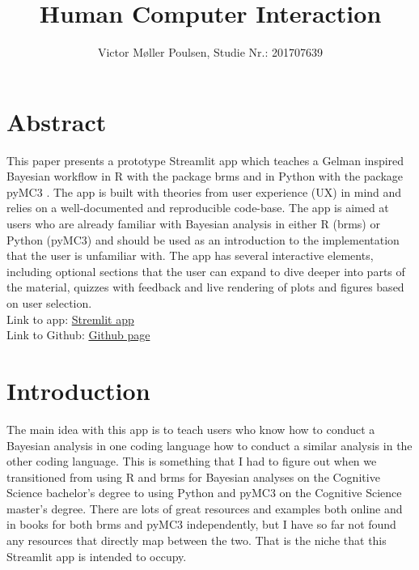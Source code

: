 \documentclass[12pt]{article}
\title{Human Computer Interaction}
\author{Victor Møller Poulsen, Studie Nr.: 201707639}
\begin{document}
\maketitle
\leavevmode

\section{Abstract}
This paper presents a prototype Streamlit app which teaches a Gelman
\autocite{gelman2020bayesian} inspired Bayesian workflow
in R with the package brms \autocite{Burkner2017} and in Python with the
package pyMC3 \autocite{Salvatier2016}. The app is built with theories from user
experience (UX) in mind and relies on a well-documented and reproducible code-base. The app is
aimed at users who are already familiar with Bayesian analysis in either R
(brms) or Python (pyMC3) and should be used as an introduction to the
implementation that the user is unfamiliar with. The app has several
interactive elements, including optional sections that the user can expand to
dive deeper into parts of the material, quizzes with feedback and live
rendering of plots and figures based on user selection. \\
Link to app: \href{https://share.streamlit.io/victor-m-p/bayesworkflow/main/BayesWorkflow.py}{Stremlit app}\\
Link to Github: \href{https://github.com/victor-m-p/BayesWorkflow}{Github page}

\tableofcontents
\section{Introduction}

The main idea with this app is to teach users who know how to conduct a Bayesian analysis in one coding
language how to conduct a similar analysis in the other coding language. This is something
that I had to figure out when we transitioned from using R and brms for Bayesian analyses
on the Cognitive Science bachelor's degree to using Python and pyMC3 on the Cognitive Science
master's degree. There are lots of great resources and examples both online and in books for both
brms and pyMC3 independently, but I have so far not found any resources that directly map between
the two. That is the niche that this Streamlit app is intended to occupy.

\vspace{5mm}
\end{document}
